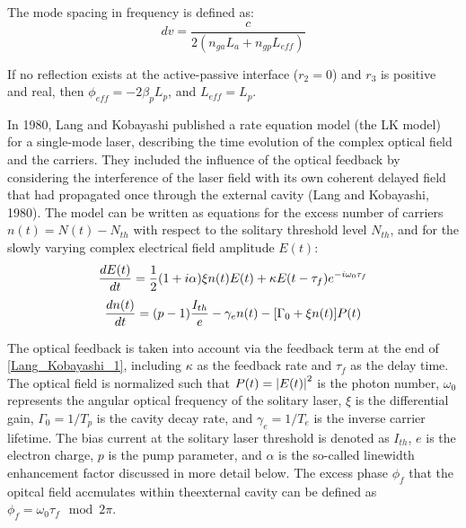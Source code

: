 The mode spacing in frequency is defined as:
\begin{equation}
    dv=\frac{c}{2(n_{ga}L_a+n_{gp}L_{eff})}
    \label{mode_spacing}
\end{equation}

If no reflection exists at the active-passive interface ($r_2=0$) and $r_3$ is positive and real, then $\phi_{eff}=-2\beta_pL_p$, and $L_{eff}=L_p$.



In 1980, Lang and Kobayashi published a rate equation model (the LK model) for a single-mode laser, describing the time evolution of the complex optical field and the carriers. They included the influence of the optical feedback by considering the interference of the laser field with its own coherent delayed field that had propagated once through the external cavity (Lang and Kobayashi, 1980). The model can be written as equations for the excess number of carriers $n(t)=N(t)-N_{th}$ with respect to the solitary threshold level $N_{th}$, and for the slowly varying complex electrical field amplitude $E(t)$:
\begin{equation}
    \dv{E(t)}{t}=\frac{1}{2}\qty(1+i\alpha)\xi n(t)E(t)+\kappa E\qty(t-\tau_f)e^{-i\omega_0\tau_f}
    \label{Lang_Kobayashi_1}
\end{equation}
\begin{equation}
    \dv{n(t)}{t}=\qty(p-1)\frac{I_{th}}{e}-\gamma_e n(t)-\qty[\Gamma_0+\xi n(t)]P(t)
    \label{Lang_Kobayashi_2}
\end{equation}

The optical feedback is taken into account via the feedback term at the end of \autoref{Lang_Kobayashi_1}, including $\kappa$ as the feedback rate and $\tau_f$ as the delay time. The optical field is normalized such that $P(t)=\abs{E(t)}^2$ is the photon number, $\omega_0$ represents the angular optical frequency of the solitary laser, $\xi$ is the differential gain, $\Gamma_0=1/T_p$ is the cavity decay rate, and $\gamma_e=1/T_e$ is the inverse carrier lifetime. The bias current at the solitary laser threshold is denoted as $I_{th}$, $e$ is the electron charge, $p$ is the pump parameter, and $\alpha$ is the so-called linewidth enhancement factor discussed in more detail below. The excess phase $\phi_f$ that the opitcal field accmulates within theexternal cavity can be defined as $\phi_f=\omega_0\tau_f\mod2\pi$.

